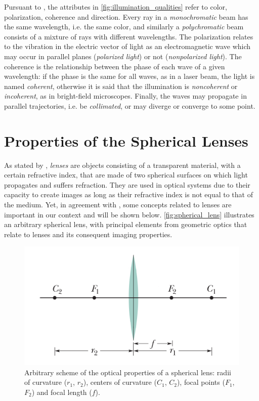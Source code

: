 Pursuant to , the attributes in \autoref{fig:illumination_qualities} refer to color, polarization, coherence and direction. Every ray in a \emph{monochromatic} beam has the same wavelength, i.e. the same color, and similarly a \emph{polychromatic} beam consists of a mixture of rays with different wavelengths. The polarization relates to the vibration in the electric vector of light as an electromagnetic wave which may occur in parallel planes (\emph{polarized light}) or not (\emph{nonpolarized light}). The coherence is the relationship between the phase of each wave of a given wavelength: if the phase is the same for all waves, as in a laser beam, the light is named \emph{coherent}, otherwise it is said that the illumination is \emph{noncoherent} or \emph{incoherent}, as in bright-field microscopes. Finally, the waves may propagate in parallel trajectories, i.e. be \emph{collimated}, or may diverge or converge to some point.

\section{Properties of the Spherical Lenses}

As stated by , \emph{lenses} are objects consisting of a transparent material, with a certain refractive index, that are made of two spherical surfaces on which light propagates and suffers refraction. They are used in optical systems due to their capacity to create images as long as their refractive index is not equal to that of the medium. Yet, in agreement with , some concepts related to lenses are important in our context and will be shown below. \autoref{fig:spherical_lens} illustrates an arbitrary spherical lens, with principal elements from geometric optics that relate to lenses and its consequent imaging properties.

\begin{figure}[htb]
	\centering
	\caption{\label{fig:spherical_lens} Arbitrary scheme of the optical properties of a spherical lens: radii of curvature ($r_{1}$, $r_{2}$), centers of curvature ($C_{1}$, $C_{2}$), focal points ($F_{1}$, $F_{2}$) and focal length ($f$).}
	\begin{center}
	    \includegraphics[scale=0.4]{images/fig4.png}
	\end{center}
	\centering
\end{figure}

